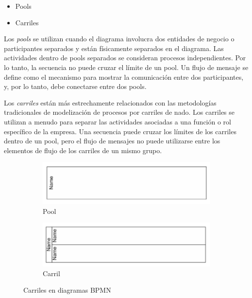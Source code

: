 \begin{itemize}
    \item Pools
    \item Carriles
\end{itemize}

Los \textit{pools} se utilizan cuando el diagrama involucra dos entidades de negocio o participantes separados y están físicamente separados en el diagrama.
Las actividades dentro de pools separados se consideran procesos independientes. Por lo tanto, la secuencia no puede cruzar el límite de un pool.
Un flujo de mensaje se define como el mecanismo para mostrar la comunicación entre dos participantes, y, por lo tanto, debe conectarse entre dos pools.

Los \textit{carriles} están más estrechamente relacionados con las metodologías tradicionales de modelización de procesos por carriles de nado.
Los carriles se utilizan a menudo para separar las actividades asociadas a una función o rol específico de la empresa.
Una secuencia puede cruzar los límites de los carriles dentro de un pool, pero el flujo de mensajes no puede utilizarse entre los elementos de flujo de los carriles de un mismo grupo.

\begin{figure}[H]
    \centering
    \begin{subfigure}[b]{0.45\textwidth}
        \centering
        \includegraphics[width=\textwidth]{img/bpmn-pool.png}
        \caption{Pool}
    \end{subfigure}
    \hfill
    \begin{subfigure}[b]{0.45\textwidth}
        \centering
        \includegraphics[width=\textwidth]{img/bpmn-lane.png}
        \caption{Carril}
    \end{subfigure}
    \caption{Carriles en diagramas BPMN}
    \label{fig:bpmn-pools}
\end{figure}

